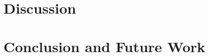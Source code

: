 \documentclass{llncs}
\begin{document}
\section{Discussion}
\section{Conclusion and Future Work}

%
%
\end{document}
